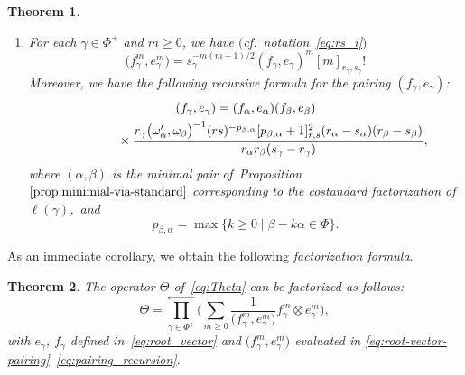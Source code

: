 \documentclass[pdftex]{sigma}
\numberwithin{equation}{section}
\newtheorem{Theorem}{Theorem}[section]
\begin{document}
\begin{Theorem}
\begin{enumerate}
\item[$(c)$] For each $\gamma \in \Phi^{+}$ and $m \ge 0$, we have $($cf.\ notation~\eqref{eq:rs_i}$)$
\begin{equation}\label{eq:root-vector-pairing}
 \bigl(f_{\gamma}^{m},e_{\gamma}^{m}\bigr) = s_{\gamma}^{-m(m - 1)/2} (f_{\gamma},e_{\gamma})^{m}[m]_{r_{\gamma},s_{\gamma}}!
\end{equation}
Moreover, we have the following recursive formula for the pairing $(f_\gamma,e_\gamma)$:
\begin{gather}
 (f_{\gamma},e_{\gamma}) = (f_{\alpha},e_{\alpha}) (f_{\beta},e_{\beta})\nonumber \\
 \hphantom{(f_{\gamma},e_{\gamma}) =}{}\times
 \frac{r_{\gamma}\bigl(\omega_{\alpha}',\omega_{\beta}\bigr)^{-1}(rs)^{-p_{\beta,\alpha}}[p_{\beta,\alpha} + 1]_{r,s}^{2}(r_{\alpha} - s_{\alpha})(r_{\beta} - s_{\beta})}
 {r_{\alpha}r_{\beta}(s_{\gamma} - r_{\gamma})},\label{eq:pairing_recursion}
\end{gather}
where $(\alpha,\beta)$ is the minimal pair of~Proposition~$\ref{prop:minimial-via-standard}$ corresponding to the costandard factorization of $\ell(\gamma)$,~and
\begin{displaymath}
 p_{\beta,\alpha} = \max \{k \ge 0\mid \beta - k\alpha \in \Phi\}.
\end{displaymath}
\end{enumerate}
\end{Theorem}


As an immediate corollary, we obtain the following \textit{factorization formula}.


\begin{Theorem}\label{cor:Theta-factorization} The operator $\Theta$ of~\eqref{eq:Theta} can be factorized as follows:
\begin{equation}\label{eq:Theta-factorized}
 \Theta=\overset{\longleftarrow}{\underset{\gamma \in \Phi^{+}}{\prod}}
 \biggl( \sum_{m\geq 0} \frac{1}{\bigl(f^m_{\gamma},e^m_{\gamma}\bigr)} f^m_\gamma\otimes e^m_\gamma \biggr),
\end{equation}
with $e_\gamma$, $f_\gamma$ defined in~\eqref{eq:root_vector} and $\bigl(f_{\gamma}^m,e_{\gamma}^m\bigr)$ evaluated in \eqref{eq:root-vector-pairing}--\eqref{eq:pairing_recursion}.
\end{Theorem}
\end{document}
